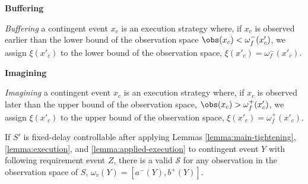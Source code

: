 \documentclass[11pt]{article}
\begin{document}
\begin{defn}
\textbf{Buffering}

\emph{Buffering} a contingent event \(x_{c}\) is an execution strategy where, if \(x_{c}\) is observed
earlier than the lower bound of the observation space \(\obs(x_{c}) < \omega_{f}^-(x'_{c})\), we
assign \(\xi(x'_{c})\) to the lower bound of the observation space, \(\xi(x'_{c}) =
\omega_{f}^-(x'_{c})\).
\end{defn}

\begin{defn}
\textbf{Imagining}

\emph{Imagining} a contingent event \(x_{c}\) is an execution strategy where, if \(x_{c}\) is observed later
than the upper bound of the observation space, \(\obs(x_{c}) > \omega_{f}^+(x'_{c})\), we assign
\(\xi(x'_{c})\) to the upper bound of the observation space, \(\xi(x'_{c}) = \omega_{f}^+(x'_{c})\).
\end{defn}

\begin{lemma}
If \(S'\) is fixed-delay controllable after applying Lemmas \ref{lemma:main-tightening}, \ref{lemma:execution},
and \ref{lemma:applied-execution} to contingent event \(Y\) with following requirement event \(Z\), there is a
valid \(\mathcal{S}\) for any observation in the observation space of \(S\), \(\omega_{v}(Y) = [a^-(Y),
b^+(Y)]\).
\end{lemma}
\end{document}
